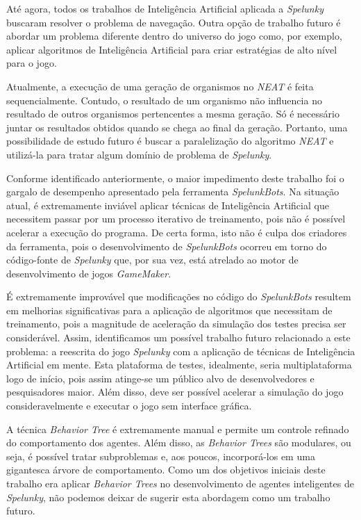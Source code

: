 Até agora, todos os trabalhos de Inteligência Artificial aplicada a
\textit{Spelunky} buscaram resolver o problema de navegação. Outra opção de
trabalho futuro é abordar um problema diferente dentro do universo do jogo como,
por exemplo, aplicar algoritmos de Inteligência Artificial para criar
estratégias de alto nível para o jogo.

Atualmente, a execução de uma geração de organismos no \textit{NEAT} é feita
sequencialmente.  Contudo, o resultado de um organismo não influencia no
resultado de outros organismos pertencentes a mesma geração. Só é necessário
juntar os resultados obtidos quando se chega ao final da geração. Portanto, uma
possibilidade de estudo futuro é buscar a paralelização do algoritmo
\textit{NEAT} e utilizá-la para tratar algum domínio de problema de
\textit{Spelunky}.

Conforme identificado anteriormente, o maior impedimento deste trabalho foi o
gargalo de desempenho apresentado pela ferramenta \textit{SpelunkBots}. Na
situação atual, é extremamente inviável aplicar técnicas de Inteligência
Artificial que necessitem passar por um processo iterativo de treinamento, pois
não é possível acelerar a execução do programa. De certa forma, isto não é culpa
dos criadores da ferramenta, pois o desenvolvimento de \textit{SpelunkBots}
ocorreu em torno do código-fonte de \textit{Spelunky} que, por sua vez, está
atrelado ao motor de desenvolvimento de jogos \textit{GameMaker}. 

É extremamente improvável que modificações no código do \textit{SpelunkBots}
resultem em melhorias significativas para a aplicação de algoritmos que
necessitam de treinamento, pois a magnitude de aceleração da simulação dos
testes precisa ser considerável. Assim, identificamos um possível trabalho
futuro relacionado a este problema: a reescrita do jogo \textit{Spelunky} com a
aplicação de técnicas de Inteligência Artificial em mente. Esta plataforma de
testes, idealmente, seria multiplataforma logo de início, pois assim atinge-se
um público alvo de desenvolvedores e pesquisadores maior. Além disso, deve ser
possível acelerar a simulação do jogo consideravelmente e executar o jogo sem
interface gráfica.

A técnica \textit{Behavior Tree} é extremamente manual e permite um controle
refinado do comportamento dos agentes. Além disso, as \textit{Behavior Trees}
são modulares, ou seja, é possível tratar subproblemas e, aos poucos,
incorporá-los em uma gigantesca árvore de comportamento. Como um dos objetivos
iniciais deste trabalho era aplicar \textit{Behavior Trees} no desenvolvimento
de agentes inteligentes de \textit{Spelunky}, não podemos deixar de sugerir esta
abordagem como um trabalho futuro.
